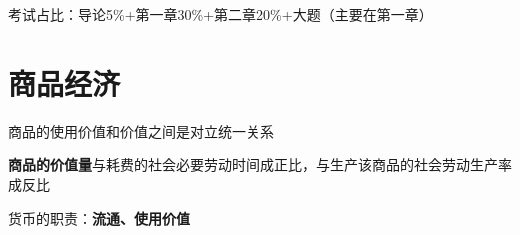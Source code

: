 考试占比：导论5\%+第一章30\%+第二章20\%+大题（主要在第一章）
\section{商品经济}%
\label{sec:商品经济}
\begin{notation}
    商品的使用价值和价值之间是对立统一关系
\end{notation}
\begin{notation}
    \textbf{商品的价值量}与耗费的社会必要劳动时间成正比，与生产该商品的社会劳动生产率成反比
\end{notation}
\begin{notation}
    货币的职责：\textbf{流通、使用价值}
\end{notation}
